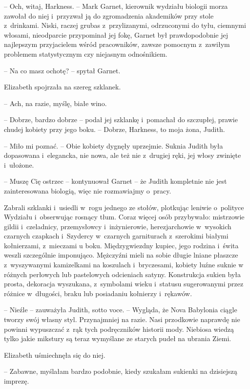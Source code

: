 \documentclass[oneside,polish,12pt,sfheadings]{mwbk}
\begin{document}
-- Och, witaj, Harkness. -- Mark Garnet, kierownik wydziału biologii morza
zawołał do niej i~przyzwał ją do zgromadzenia akademików przy stole z~drinkami. Niski, raczej grubas z~przylizanymi, odrzuconymi do tyłu,
ciemnymi włosami, nieodparcie przypominał jej fokę, Garnet był
prawdopodobnie jej najlepszym przyjacielem wśród pracowników, zawsze
pomocnym z~zawiłym problemem statystycznym czy niejasnym odnośnikiem.

-- Na co masz ochotę? -- spytał Garnet.

Elizabeth spojrzała na szereg szklanek. 

-- Ach, na razie, myślę, białe wino.

-- Dobrze, bardzo dobrze -- podał jej szklankę i~pomachał do szczupłej,
prawie chudej kobiety przy jego boku. -- Dobrze, Harkness, to moja żona,
Judith.

-- Miło mi poznać. -- Obie kobiety dygnęły uprzejmie. Suknia Judith była
dopasowana i~elegancka, nie nowa, ale też nie z~drugiej ręki, jej włosy
zwinięte i~ułożone.

-- Muszę Cię ostrzec -- kontynuował Garnet -- że Judith kompletnie nie jest
zainteresowana biologią, więc nie rozmawiajmy o~pracy.

Zabrali szklanki i~usiedli w~rogu jednego ze stołów, plotkując leniwie o~polityce Wydziału i~obserwując rosnący tłum. Coraz więcej osób
przybywało: mistrzowie gildii i~czeladnicy, przemysłowcy i~inżynierowie,
herezjarchowie w~wysokich czarnych czapkach i~Szydercy w~czarnych
garniturach z~szerokimi białymi kołnierzami, z~mieczami u boku.
Międzygwiezdny kupiec, jego rodzina i~świta weszli szczególnie
imponująco. Mężczyźni mieli na sobie długie lniane płaszcze z~wyszywanymi kamizelkami na koszulach i~bryczesami, kobiety luźne suknie
w różnych perłowych lub pastelowych odcieniach satyny. Konstrukcja
sukien była prosta, dekoracja wyszukana, z~symbolami wieku i~statusu
sugerowanymi przez różnice w~długości, braku lub posiadaniu kołnierzy i~rękawów.

-- Nieźle -- zauważyła Judith, sotto voce. -- Wygląda, że Nova Babylonia
ciągle tworzy swój własny styl. Przynajmniej na razie. Nasi przodkowie
naprawdę nie powinni wypuszczać z~rąk tych podręczników historii mody.
Niebiosa wiedzą tylko jakie mikstury są teraz wymyślane ze starych pudeł
na ubrania Ziemi.

Elizabeth uśmiechnęła się do niej. 

-- Zabawne, myślałam bardzo podobnie, kiedy szukałam sukienki na dzisiejszą imprezę.
\end{document}
